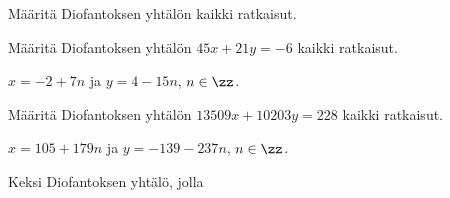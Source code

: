 \begin{tehtava}
    Määritä Diofantoksen yhtälön kaikki ratkaisut.
    
    \begin{alakohdat}
    \end{alakohdat}

    \begin{vastaus}
        \begin{alakohdat}
        \end{alakohdat}
    \end{vastaus}
    
\end{tehtava}

\begin{tehtava}
    Määritä Diofantoksen yhtälön $45x + 21y = -6$ kaikki ratkaisut.

    \begin{vastaus}
        $x = -2 + 7n$ ja $y = 4 - 15n$, $n\in\zz$.
    \end{vastaus}
    
\end{tehtava}

\begin{tehtava}
    Määritä Diofantoksen yhtälön $13509x + 10203y = 228$ kaikki ratkaisut.
    
    \begin{vastaus}
        $x = 105 + 179n$ ja $y = -139 - 237n$, $n\in\zz$.
    \end{vastaus}
    
\end{tehtava}

\begin{tehtava}
    Keksi Diofantoksen yhtälö, jolla
    \begin{alakohdat}
    \end{alakohdat}

    \begin{vastaus}
        \begin{alakohdat}
        \end{alakohdat}
    \end{vastaus}
    
\end{tehtava}

